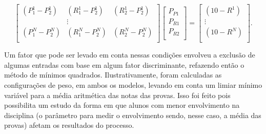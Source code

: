 \documentclass[11pt]{article}
\begin{document}
                \begin{equation}
                        \begin{bmatrix}
                                (P_{1}^1 - P_{2}^1) &
                                (R_{1}^1 - P_{2}^1) &
                                (R_{2}^1 - P_{2}^1)   \\
                                & \vdots &            \\
                                (P_{1}^N - P_{2}^N) &
                                (R_{1}^N - P_{2}^N) &
                                (R_{2}^N - P_{2}^N)   \\
                        \end{bmatrix}
                        \begin{bmatrix}
                                P_{P1} \\
                                P_{R1} \\
                                P_{R2} \\
                        \end{bmatrix}
                        =
                        \begin{bmatrix}
                                (10 - R^1) \\
                                \vdots      \\
                                (10 - R^N) \\
                        \end{bmatrix}.
                        \label{LINEAR_PESOS_INDEPENDENTES}
                \end{equation}

                Um fator que pode ser levado em conta nessas
                condições envolveu a exclusão de algumas
                entradas com base em algum fator discriminante,
                refazendo então o método de mínimos quadrados.
                Ilustrativamente, foram calculadas as
                configurações de peso, em ambos os modelos,
                levando em conta um limiar mínimo variável
                para a média aritmética das notas das provas.
                Isso foi feito pois possibilita um estudo da
                forma em que alunos com menor envolvimento na
                disciplina (o parâmetro para medir o
                envolvimento sendo, nesse caso, a média das
                provas) afetam os resultados do processo.
\end{document}
